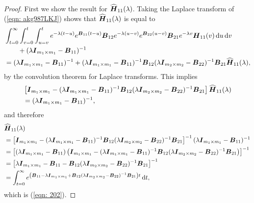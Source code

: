 \begin{proof}
	First we show the result for \(\widehat{\boldsymbol H}_{11}(\lambda)\). Taking the Laplace transform of (\ref{eqn: akg987LKJ}) shows that \(\widehat{\boldsymbol H}_{11}(\lambda)\) is equal to 
	\begin{align}
		&\int_{t=0}^\infty \int_{v=0}^t\int_{u=v}^t e^{-\lambda (t-u)}e^{\boldsymbol B_{11}(t-u)}\boldsymbol B_{12}e^{-\lambda (u-v)}e^{\boldsymbol B_{22}(u-v)}\boldsymbol B_{21}e^{-\lambda v}\boldsymbol H_{11}(v)\, \mathrm{d} u\, \mathrm{d} v \nonumber 
		\\&\qquad{}+ (\lambda \boldsymbol I_{m_1\times m_1} - \boldsymbol B_{11})^{-1}\nonumber 
		\\& = (\lambda \boldsymbol I_{m_1\times m_1} - \boldsymbol B_{11})^{-1} + (\lambda \boldsymbol I_{m_1\times m_1} - \boldsymbol B_{11})^{-1}\boldsymbol B_{12}(\lambda \boldsymbol I_{m_2\times m_2}-\boldsymbol B_{22})^{-1}\boldsymbol B_{21}\widehat{\boldsymbol H}_{11}(\lambda),
	\end{align}
	by the convolution theorem for Laplace transforms. This implies
	\begin{align*}
		&\left[\boldsymbol I_{m_1\times m_1} -  (\lambda \boldsymbol I_{m_1\times m_1} - \boldsymbol B_{11})^{-1}\boldsymbol B_{12}(\lambda \boldsymbol I_{m_2\times m_2}-\boldsymbol B_{22})^{-1}\boldsymbol B_{21}\right]\widehat{\boldsymbol H}_{11}(\lambda) 
		\\&= (\lambda \boldsymbol I_{m_1\times m_1} - \boldsymbol B_{11})^{-1},
	\end{align*}
	and therefore 
	\begin{align*}
		&\widehat{\boldsymbol H}_{11}(\lambda) 
		\\&= \left[\boldsymbol I_{m_1\times m_1} -  (\lambda \boldsymbol I_{m_1\times m_1} - \boldsymbol B_{11})^{-1}\boldsymbol B_{12}(\lambda \boldsymbol I_{m_2\times m_2}-\boldsymbol B_{22})^{-1}\boldsymbol B_{21}\right]^{-1} (\lambda \boldsymbol I_{m_1\times m_1} - \boldsymbol B_{11})^{-1}
		\\&= \left[(\lambda \boldsymbol I_{m_1\times m_1} - \boldsymbol B_{11})\left(\boldsymbol I_{m_1\times m_1} -  (\lambda \boldsymbol I_{m_1\times m_1} - \boldsymbol B_{11})^{-1}\boldsymbol B_{12}(\lambda \boldsymbol I_{m_2\times m_2}-\boldsymbol B_{22})^{-1}\boldsymbol B_{21}\right)\right]^{-1} 
		\\&= \left[\lambda \boldsymbol I_{m_1\times m_1} - \boldsymbol B_{11} - \boldsymbol B_{12}(\lambda \boldsymbol I_{m_2\times m_2}-\boldsymbol B_{22})^{-1}\boldsymbol B_{21}\right]^{-1}
		\\&= \int_{t=0}^\infty e^{\left(\boldsymbol B_{11} - \lambda \boldsymbol I_{m_1\times m_1} + \boldsymbol B_{12}(\lambda \boldsymbol I_{m_2\times m_2}-\boldsymbol B_{22})^{-1}\boldsymbol B_{21}\right)t}\, \mathrm{d} t,
	\end{align*}
	which is (\ref{eqn: 202}). 
	

\end{proof}
